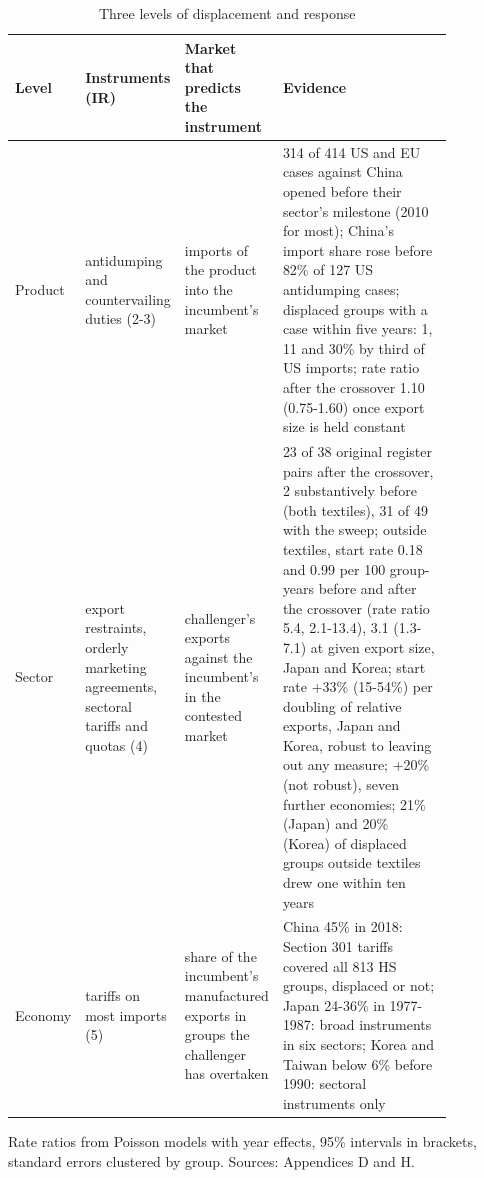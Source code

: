 \documentclass[review,authoryear,12pt]{elsarticle}
\newcommand{\tabnote}[1]{\par\smallskip\begin{minipage}{\linewidth}\footnotesize #1\end{minipage}}
\begin{document}
\begin{table}[t]
\centering\footnotesize
\caption{Three levels of displacement and response}\label{tab:reach}
\begin{tabular}{L{0.11\linewidth}L{0.18\linewidth}L{0.18\linewidth}L{0.40\linewidth}}
\toprule
Level & Instruments (IR) & Market that predicts the instrument & Evidence \\
\midrule
Product & antidumping and countervailing duties (2-3) & imports of the product into the incumbent's market & 314 of 414 US and EU cases against China opened before their sector's milestone (2010 for most); China's import share rose before 82\% of 127 US antidumping cases; displaced groups with a case within five years: 1, 11 and 30\% by third of US imports; rate ratio after the crossover 1.10 (0.75-1.60) once export size is held constant \\
\addlinespace
Sector & export restraints, orderly marketing agreements, sectoral tariffs and quotas (4) & challenger's exports against the incumbent's in the contested market & 23 of 38 original register pairs after the crossover, 2 substantively before (both textiles), 31 of 49 with the sweep; outside textiles, start rate 0.18 and 0.99 per 100 group-years before and after the crossover (rate ratio 5.4, 2.1-13.4), 3.1 (1.3-7.1) at given export size, Japan and Korea; start rate +33\% (15-54\%) per doubling of relative exports, Japan and Korea, robust to leaving out any measure; +20\% (not robust), seven further economies; 21\% (Japan) and 20\% (Korea) of displaced groups outside textiles drew one within ten years \\
\addlinespace
Economy & tariffs on most imports (5) & share of the incumbent's manufactured exports in groups the challenger has overtaken & China 45\% in 2018: Section 301 tariffs covered all 813 HS groups, displaced or not; Japan 24-36\% in 1977-1987: broad instruments in six sectors; Korea and Taiwan below 6\% before 1990: sectoral instruments only \\
\bottomrule
\end{tabular}

\tabnote{Rate ratios from Poisson models with year effects, 95\% intervals in brackets, standard errors clustered by group. Sources: Appendices D and H.}
\end{table}
\end{document}

